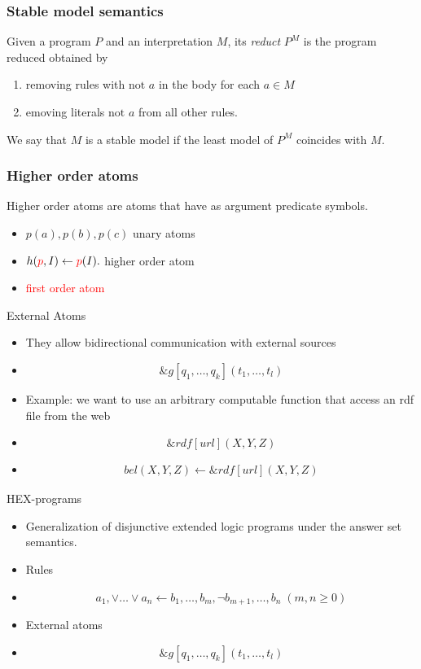 \documentclass[smaller, dvipsnames]{beamer}
\begin{document}
\begin{frame}
	\frametitle{Stable model semantics}
	\begin{center} \colorbox{Gray}{} \end{center}
	Given a program \(P\) and an interpretation \(M\), its \emph{reduct} \(P^M\) is the program reduced obtained by 
	\begin{enumerate}
		\item removing rules with \(\text{not } a\) in the body for each \(a \in M\)
		\item emoving literals \(\text{not } a\) from all other rules.
	\end{enumerate}	  
	We say that \(M\) is a stable model if the least model of \(P^M\) coincides with \(M\).
\end{frame}

\begin{frame}
	\frametitle{Higher order atoms}
	Higher order atoms are atoms that have as argument predicate symbols.
	\begin{itemize}
		\item<1->[] \(p(a),p(b),p(c)\) \quad \quad \quad \quad \quad unary atoms
		\item<2->[] \(h(\textcolor{red}{p},I) \leftarrow \textcolor{red}{p}(I).\) \quad \quad \quad \quad \quad higher order atom
		\item<2->[] \textcolor{red}{first order atom}
	\end{itemize}
\end{frame}

\begin{frame}{External Atoms}
    \begin{itemize}
    	\item<1-> They allow bidirectional communication with external sources
    	\item<2->[] \[ \&g[q_1,\dots,q_k](t_1,\dots,t_l) \]
    	\item<3-> Example: we want to use an arbitrary computable function that access an rdf file from the web
    	\item<4->[] \[ \&rdf[url](X,Y,Z) \]
    	\item<5->[] 
    		\begin{align*}
				bel(X,Y,Z) \leftarrow \&rdf[url](X,Y,Z)
    		\end{align*}
    \end{itemize}
\end{frame}

\begin{frame}{HEX-programs}
    \begin{itemize}
    	\item<1-> Generalization of disjunctive extended logic programs under the answer set semantics.
    	\item<2-> Rules
    	\item<2->[] \[ a_1, \lor \dots \lor a_n \leftarrow b_1, \dots , b_m, \neg b_{m+1}, \dots, b_n \; (m,n \geq 0)\]
    	\item<3-> External atoms
    	\item<3->[] \[ \&g[q_1,\dots,q_k](t_1,\dots,t_l) \]
    \end{itemize}
\end{frame}
\end{document}
